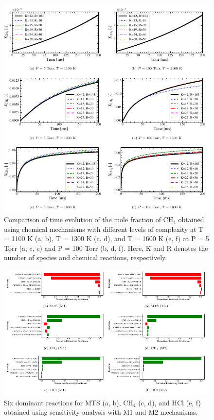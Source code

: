 \documentclass[final, letterpaper, square, comma, numbers, sort&compress]{elsarticle}
\begin{document}
\begin{figure}[p]
    \centering\includegraphics[width=\textwidth]{ph-fig3.png}
\caption{Comparison of time evolution of the mole fraction of CH$_4$ obtained using chemical mechanisms with different levels of complexity at T = 1100 K (a, b), T = 1300 K (c, d), and T = 1600 K (e, f) at P = 5 Torr (a, c, e) and P = 100 Torr (b, d, f). Here, K and R denotes the number of species and chemical reactions, respectively.}
\label{T-vs-t-CH4}
\end{figure}

\begin{figure}[tp] %
    \centering\includegraphics[width=\textwidth]{ph-fig4.png}
\caption{Six dominant reactions for MTS (a, b), CH$_4$ (c, d), and HCl (e, f) obtained using sensitivity analysis with M1 and M2 mechanisms.}
\label{Reactions-MTS-CH4-HCl}
\end{figure}
\end{document}
